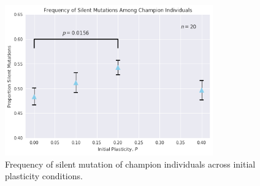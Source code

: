 \begin{figure}
    \centering
    \includegraphics[width=0.8\textwidth]{img/freq_silent_plasticity}
 	\captionsetup{singlelinecheck=off,justification=raggedright}
  	\caption{Frequency of silent mutation of champion individuals across initial plasticity conditions.}
    \label{fig:freq_silent_plasticity}
\end{figure}